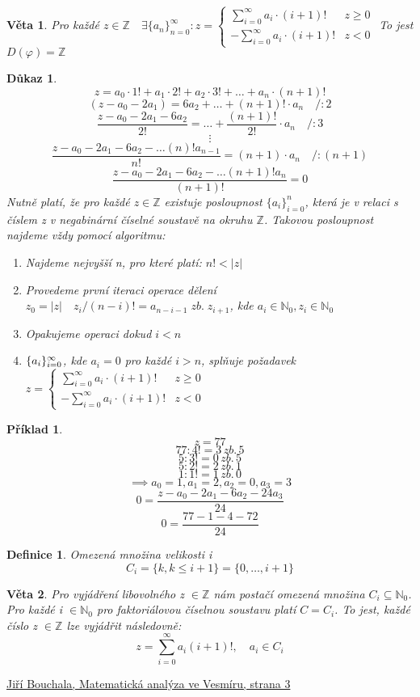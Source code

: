 \documentclass[12pt]{book}
\newtheorem{definice}{Definice}
\newtheorem{veta}{Věta}
\newtheorem*{pr}{Příklad}
\newtheorem*{dukaz}{Důkaz}
\begin{document}
\begin{veta}
	Pro každé $z \in \mathbb{Z} \quad \exists\{a_n\}_{n=0}^\infty:z=
	\begin{cases} \sum_{i=0}^{\infty}a_i\cdot(i+1)! &z\ge0 \\
	-\sum_{i=0}^{\infty}a_i\cdot(i+1)! & z<0 \end{cases}$
	To jest $D(\varphi)=\mathbb{Z}$
\end{veta}
\begin{dukaz}
	$$z=a_0\cdot1!+a_1\cdot2!+a_2\cdot3!+\dots+a_n\cdot(n+1)!$$
	$$(z-a_0-2a_1)=6a_2+\dots+(n+1)!\cdot a_n\quad /:2$$
	$$\frac{z-a_0-2a_1-6a_2}{2!}=\dots+\frac{(n+1)!}{2!}\cdot a_n\quad /:3$$
	$$\vdots$$
	$$\frac{z-a_0-2a_1-6a_2-\dots(n)!a_{n-1}}{n!}=(n+1)\cdot a_n\quad /:(n+1)$$
	$$\frac{z-a_0-2a_1-6a_2-\dots(n+1)!a_{n}}{(n+1)!}=0$$
	Nutně platí, že pro každé $z\in\mathbb{Z}$ existuje posloupnost $\{a_i\}_{i=0}^n$, která je v relaci s číslem z v negabinární číselné soustavě na okruhu $\mathbb{Z}$.\newline
	Takovou posloupnost najdeme vždy pomocí algoritmu:
	\begin{enumerate}
		\item Najdeme nejvyšší n, pro které platí: $n! < |z|$
		\item Provedeme první iteraci operace dělení $z_0=|z|\quad z_i/(n-i)!=a_{n-i-1}\;zb.\;z_{i+1}$, kde $ a_i\in\mathbb{N}_0, 
		z_i\in\mathbb{N}_0$
		\item Opakujeme operaci dokud $i<n$
		\item $\{a_i\}_{i=0}^{\infty}$, kde $a_i=0$ pro každé $i>n$, splňuje požadavek $z=
		\begin{cases} \sum_{i=0}^{\infty}a_i\cdot(i+1)! &z\ge0 \\
		-\sum_{i=0}^{\infty}a_i\cdot(i+1)! & z<0 \end{cases}$
	\end{enumerate}
\end{dukaz}
\begin{pr}
	$$z=77$$
	$$77:4!=3\,zb.\,5$$
	$$5:3!=0\,zb.\,5$$
	$$5:2!=2\,zb.\,1$$
	$$1:1!=1\,zb.\,0$$
	$$\implies a_0=1, a_1=2,a_2=0,a_3=3$$
	$$0=\frac{z-a_0-2a_1-6a_2-24a_3}{24}$$
	$$0=\frac{77-1-4-72}{24}$$
\end{pr}
\begin{definice}
	Omezená množina velikosti i\newline
	$$C_i=\{k,k\le i+1\}=\{0,\dots,i+1\}$$
\end{definice}
\begin{veta}
	Pro vyjádření libovolného z $\in\mathbb{Z}$ nám postačí omezená množina $C_i\subseteq\mathbb{N}_0$. Pro každé i $\in \mathbb{N}_0$ pro faktoriálovou číselnou soustavu platí $C=C_i$. To jest, každé číslo z $\in\mathbb{Z}$ lze vyjádřit následovně:
	$$z=\sum_{i=0}^{\infty}a_i(i+1)!,\quad a_i\in C_i$$
\end{veta}


\begin{thebibliography}{2}
	 \href{https://homel.vsb.cz/~bou10/MA1/4.pdf}{Jiří Bouchala, Matematická analýza ve Vesmíru, strana 3}
\end{thebibliography}
\end{document}
